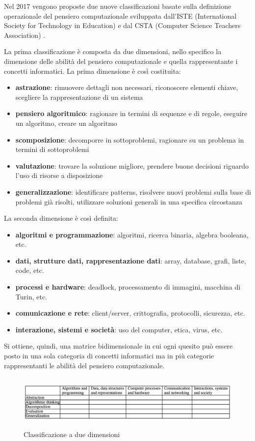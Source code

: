 \documentclass[12pt]{report}
\begin{document}
Nel 2017 vengono proposte due nuove classificazioni basate sulla definizione operazionale del pensiero computazionale sviluppata dall'ISTE (International Society for Technology in Education) e dal CSTA (Computer Science Teachers Association) \cite{flayerCT}.

La prima classificazione \cite{DagieneINFORMATICA2017} è composta da due dimensioni, nello specifico la dimensione delle abilità del pensiero computazionale e quella rappresentante i concetti informatici.
\newpage
La prima dimensione è così costituita:
\begin{itemize}
	\item \textbf{astrazione}: rimuovere dettagli non necessari, riconoscere elementi chiave, scegliere la rappresentazione di un sistema
	\item \textbf{pensiero algoritmico}: ragionare in termini di sequenze e di regole, eseguire un algoritmo, creare un algoritmo
	\item \textbf{scomposizione}: decomporre in sottoproblemi, ragionare su un problema in termini di sottoproblemi
	\item \textbf{valutazione}: trovare la soluzione migliore, prendere buone decisioni riguardo l'uso di risorse a disposizione
	\item \textbf{generalizzazione}: identificare patterns, risolvere nuovi problemi sulla base di problemi già risolti, utilizzare soluzioni generali in una specifica circostanza
\end{itemize}

La seconda dimensione è così definita:
\begin{itemize}
	\item \textbf{algoritmi e programmazione}: algoritmi, ricerca binaria, algebra booleana, etc.
	\item \textbf{dati, strutture dati, rappresentazione dati}: array, database, grafi, liste, code, etc.
	\item \textbf{processi e hardware}: deadlock, processamento di immagini, macchina di Turin, etc.
	\item \textbf{comunicazione e rete}: client/server, crittografia, protocolli, sicurezza, etc.
	\item \textbf{interazione, sistemi e società}: uso del computer, etica, virus, etc.
\end{itemize}

Si ottiene, quindi, una matrice bidimensionale in cui ogni quesito può essere posto in una sola categoria di concetti informatici ma in più categorie rappresentanti le abilità del pensiero computazionale.
\begin{figure}[H]
	\centering
	\includegraphics[height=2.7cm]{two-dimensional_classification.jpeg}
	\caption{Classificazione a due dimensioni}\label{fig:3}
\end{figure}
\end{document}
